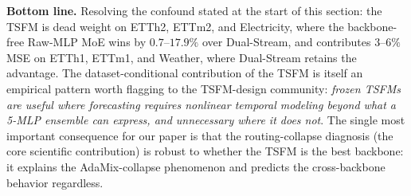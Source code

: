 \documentclass{article}
\begin{document}
\textbf{Bottom line.} Resolving the confound stated at the start of this section: the TSFM is dead weight on ETTh2, ETTm2, and Electricity, where the backbone-free Raw-MLP MoE wins by $0.7$--$17.9\%$ over Dual-Stream, and contributes $3$--$6\%$ MSE on ETTh1, ETTm1, and Weather, where Dual-Stream retains the advantage. The dataset-conditional contribution of the TSFM is itself an empirical pattern worth flagging to the TSFM-design community: \emph{frozen TSFMs are useful where forecasting requires nonlinear temporal modeling beyond what a 5-MLP ensemble can express, and unnecessary where it does not}. The single most important consequence for our paper is that the routing-collapse diagnosis (the core scientific contribution) is robust to whether the TSFM is the best backbone: it explains the AdaMix-collapse phenomenon and predicts the cross-backbone behavior regardless.

\clearpage

\end{document}

